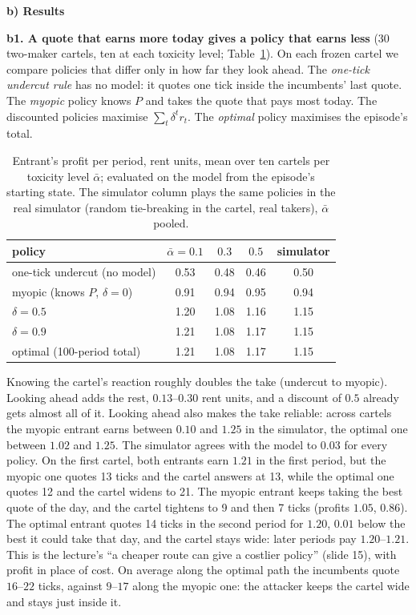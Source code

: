 \documentclass[10pt]{article}
\newcommand{\sect}[1]{\par\vspace{6pt}\noindent\textbf{#1}\par\vspace{1.5pt}\noindent}
\begin{document}
\sect{b) Results}
\textbf{b1. A quote that earns more today gives a policy that earns less} (30 two-maker cartels, ten at each toxicity level; Table~\ref{tab:planning}). On each frozen cartel we compare policies that differ only in how far they look ahead. The \emph{one-tick undercut rule} has no model: it quotes one tick inside the incumbents' last quote. The \emph{myopic} policy knows $P$ and takes the quote that pays most today. The discounted policies maximise $\sum_t\delta^t r_t$. The \emph{optimal} policy maximises the episode's total.
\begin{table}[h]\centering\small
\caption{Entrant's profit per period, rent units, mean over ten cartels per toxicity level $\bar\alpha$; evaluated on the model from the episode's starting state. The simulator column plays the same policies in the real simulator (random tie-breaking in the cartel, real takers), $\bar\alpha$ pooled.}\label{tab:planning}
\begin{tabular}{lcccc}
\toprule
policy & $\bar\alpha=0.1$ & $0.3$ & $0.5$ & simulator \\
\midrule
one-tick undercut (no model) & 0.53 & 0.48 & 0.46 & 0.50 \\
myopic (knows $P$, $\delta=0$) & 0.91 & 0.94 & 0.95 & 0.94 \\
$\delta=0.5$ & 1.20 & 1.08 & 1.16 & 1.15 \\
$\delta=0.9$ & 1.21 & 1.08 & 1.17 & 1.15 \\
optimal (100-period total) & 1.21 & 1.08 & 1.17 & 1.15 \\
\bottomrule
\end{tabular}
\end{table}

Knowing the cartel's reaction roughly doubles the take (undercut to myopic). Looking ahead adds the rest, $0.13$--$0.30$ rent units, and a discount of $0.5$ already gets almost all of it. Looking ahead also makes the take reliable: across cartels the myopic entrant earns between $0.10$ and $1.25$ in the simulator, the optimal one between $1.02$ and $1.25$. The simulator agrees with the model to $0.03$ for every policy. On the first cartel, both entrants earn $1.21$ in the first period, but the myopic one quotes 13 ticks and the cartel answers at 13, while the optimal one quotes 12 and the cartel widens to 21. The myopic entrant keeps taking the best quote of the day, and the cartel tightens to 9 and then 7 ticks (profits $1.05$, $0.86$). The optimal entrant quotes 14 ticks in the second period for $1.20$, $0.01$ below the best it could take that day, and the cartel stays wide: later periods pay $1.20$--$1.21$. This is the lecture's ``a cheaper route can give a costlier policy'' (slide 15), with profit in place of cost. On average along the optimal path the incumbents quote $16$--$22$ ticks, against $9$--$17$ along the myopic one: the attacker keeps the cartel wide and stays just inside it.
\end{document}
